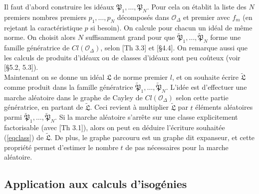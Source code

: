 \documentclass{article}
\newcommand{\OR}[0]{\mathcal{O}}
\newcommand{\LR}[0]{\mathfrak{L}}
\newcommand{\PR}[0]{\mathfrak{P}}
\newcommand{\CL}[0]{\tilde{\LR}}
\newcommand{\CP}[0]{\tilde{\PR}}
\theoremstyle{definition}
\theoremstyle{remark}
\begin{document}
	\newpage
	
	Il faut d'abord construire les idéaux $ \PR_1,\ldots,\PR_N $. Pour cela on établit la liste des $N$ premiers nombres premiers $p_1,\ldots,p_N$ décomposés dans $\OR_\Delta$ et premier avec $f_m$ (en rejetant la caractéristique $p$ si besoin). On calcule pour chacun un idéal de même norme. On choisit alors $N$ suffisamment grand pour que $\CP_1,\ldots,\CP_N$ forme une famille génératrice de $Cl(\OR_\Delta)$, selon \cite{Seysen}[Th 3.3] et \cite{JaoSoukharev}[\S 4.4]. On remarque aussi que les calculs de produits d'idéaux ou de classes d'idéaux sont peu coûteux (voir \cite{Coh00}[\S 5.2, 5.3]).\\
	
	Maintenant on se donne un idéal $\LR$ de norme premier $l$, et on souhaite écrire $\CL$ comme produit dans la famille génératrice $\CP_1,\ldots,\CP_N$. L'idée est d'effectuer une marche aléatoire dans le graphe de Cayley de $Cl(\OR_\Delta)$ selon cette partie génératrice, en partant de $\CL$. Ceci revient à multiplier $\CL$ par $t$ éléments aléatoires parmi $\CP_1,\ldots,\CP_N$. Si la marche aléatoire s'arrête sur une classe explicitement factorisable (avec \cite{Seysen}[Th 3.1]), alors on peut en déduire l'écriture souhaitée (\ref{eqclass}) de $\CL$. De plus, le graphe parcouru est un graphe dit expanseur, et cette propriété permet d'estimer le nombre $t$ de pas nécessaires pour la marche aléatoire. 
	
	\subsection{Application aux calculs d'isogénies}
	
\end{document}
